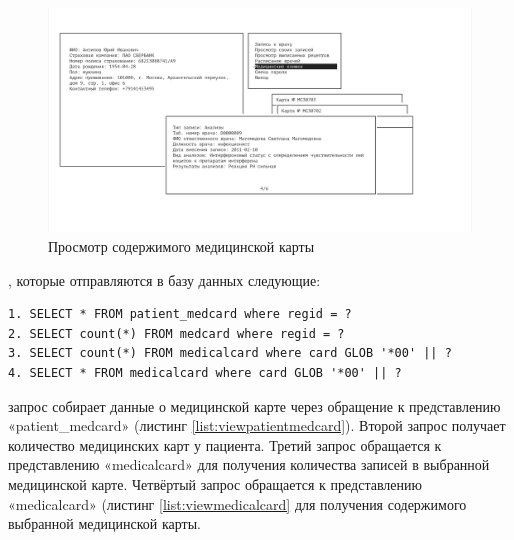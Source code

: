 \documentclass[14pt,a4paper,russian]{extreport}
\begin{document}
\begin{figure}[h!]
        \includegraphics[width=\textwidth]{prog_int/medcard-view}
        \caption{Просмотр содержимого медицинской карты}
        \label{fig:medcard-view}
\end{figure}
, которые отправляются в базу данных следующие: 
\begin{lstlisting}[style=csql] 
1. SELECT * FROM patient_medcard where regid = ?
2. SELECT count(*) FROM medcard where regid = ?
3. SELECT count(*) FROM medicalcard where card GLOB '*00' || ?
4. SELECT * FROM medicalcard where card GLOB '*00' || ?
\end{lstlisting}
 запрос собирает данные о медицинской карте через обращение к представлению «patient\_medcard» (листинг \ref{list:viewpatientmedcard}). Второй запрос получает количество медицинских карт у пациента. Третий запрос обращается к представлению «medicalcard» для получения количества записей в выбранной медицинской карте. Четвёртый запрос обращается к представлению «medicalcard» (листинг \ref{list:viewmedicalcard} для получения содержимого выбранной медицинской карты.\par\par
\end{document}
